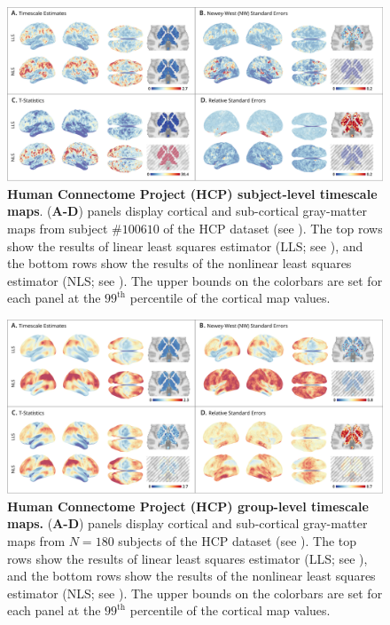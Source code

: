 \documentclass[latex/main.tex]{subfiles}
\begin{document}
\begin{figure}[H]
    \centering
    \includegraphics[width=1\textwidth]{latex/results/fig04-hcp1.png} 
    \caption{
    \textbf{Human Connectome Project (HCP) subject-level timescale maps}.
    (\textbf{A-D}) panels display cortical and sub-cortical gray-matter maps from subject $\# 100610$ of the HCP dataset (see ). The top rows show the results of linear least squares estimator (LLS; see ), and the bottom rows show the results of the nonlinear least squares estimator (NLS; see ). The upper bounds on the colorbars are set for each panel at the $99^\text{th}$ percentile of the cortical map values. 
    }
    \label{fig:map-hcp1}
\end{figure}

\begin{figure}[H]
    \centering
    \includegraphics[width=1\textwidth]{latex/results/fig05-hcp180.png} 
    \caption{
    \textbf{Human Connectome Project (HCP) group-level timescale maps.}
    (\textbf{A-D}) panels display cortical and sub-cortical gray-matter maps from $N=180$ subjects of the HCP dataset (see ). The top rows show the results of linear least squares estimator (LLS; see ), and the bottom rows show the results of the nonlinear least squares estimator (NLS; see ). The upper bounds on the colorbars are set for each panel at the $99^\text{th}$ percentile of the cortical map values. 
    }
    \label{fig:map-hcp180}
\end{figure}
\end{document}
